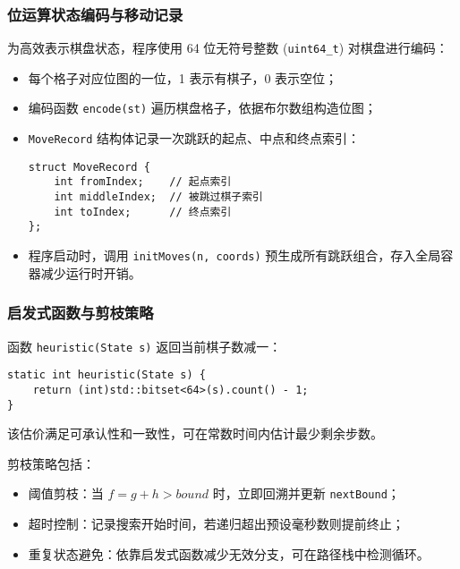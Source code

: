 \documentclass[12pt, a4paper]{article}
\begin{document}
\subsubsection{位运算状态编码与移动记录}
为高效表示棋盘状态，程序使用 64 位无符号整数 (\texttt{uint64\_t}) 对棋盘进行编码：
\begin{itemize}
  \item 每个格子对应位图的一位，1 表示有棋子，0 表示空位；
  \item 编码函数 \texttt{encode(st)} 遍历棋盘格子，依据布尔数组构造位图；
  \item \texttt{MoveRecord} 结构体记录一次跳跃的起点、中点和终点索引：
  \begin{verbatim}
struct MoveRecord {
    int fromIndex;    // 起点索引
    int middleIndex;  // 被跳过棋子索引
    int toIndex;      // 终点索引
};
  \end{verbatim}
  \item 程序启动时，调用 \texttt{initMoves(n, coords)} 预生成所有跳跃组合，存入全局容器减少运行时开销。
\end{itemize}

\subsubsection{启发式函数与剪枝策略}
函数 \texttt{heuristic(State s)} 返回当前棋子数减一：
\begin{verbatim}
static int heuristic(State s) {
    return (int)std::bitset<64>(s).count() - 1;
}
\end{verbatim}
该估价满足可承认性和一致性，可在常数时间内估计最少剩余步数。

剪枝策略包括：
\begin{itemize}
  \item 阈值剪枝：当 $f=g+h>bound$ 时，立即回溯并更新 \texttt{nextBound}；
  \item 超时控制：记录搜索开始时间，若递归超出预设毫秒数则提前终止；
  \item 重复状态避免：依靠启发式函数减少无效分支，可在路径栈中检测循环。
\end{itemize}
\end{document}
